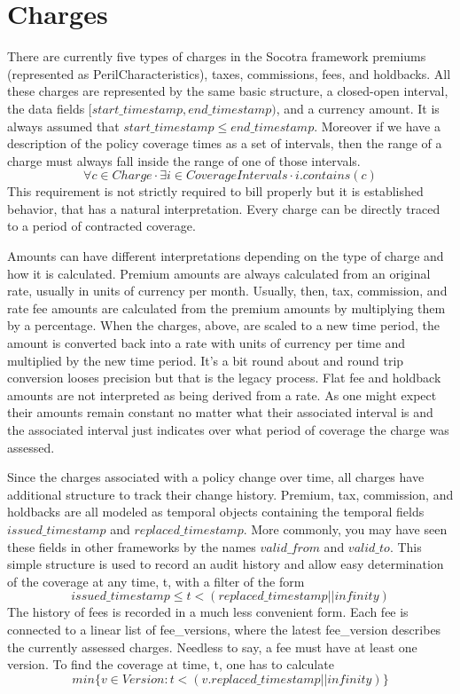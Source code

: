 \section{Charges}
\label{sec:03:4}
There are currently five types of charges in the Socotra framework premiums (represented as PerilCharacteristics), taxes,
commissions, fees, and holdbacks. All these charges are represented by the same basic structure, a closed-open
interval, the data fields $[start\_timestamp, end\_timestamp)$, and a currency amount. It is
always assumed that $start\_timestamp \leq end\_timestamp$. Moreover if we have a description of the
policy coverage times as a set of intervals, then the range of a charge must always
fall inside the range of one of those intervals.
\begin{equation*}
\forall c \in Charge \cdot \exists i \in CoverageIntervals \cdot i.contains(c)
\end{equation*}
This requirement is not strictly required to bill properly but it is established behavior, that has a natural
interpretation. Every charge can be directly traced to a period of contracted coverage.

Amounts can have different interpretations depending on the type of charge and how it is calculated.
Premium amounts are always calculated from an original rate, usually in units of currency per month. Usually, then,
tax, commission, and rate fee amounts are calculated from the premium amounts by multiplying them by a percentage.
When the charges, above, are scaled to a new time period, the amount is converted back into
a rate with units of currency per time and multiplied by the new time period. It's a bit
round about and round trip conversion looses precision but that is the legacy process. Flat fee and holdback amounts are
not interpreted as being derived from a rate. As one might expect their amounts remain constant no
matter what their associated interval is and the associated interval just indicates over what period of coverage the
charge was assessed.

Since the charges associated with a policy change over time, all charges have additional structure to track their
change history. Premium, tax, commission, and holdbacks are all modeled as temporal objects containing the temporal
fields $issued\_timestamp$ and $replaced\_timestamp$.
More commonly, you may have seen these fields in other frameworks by the names $valid\_from$ and
$valid\_to$. This simple structure is used to record an audit history and allow easy determination of the
coverage at any time, t, with a filter of the form
\begin{equation*}
issued\_timestamp \leq t < (replaced\_timestamp || infinity)
\end{equation*}
The history of fees is recorded in a much less convenient form. Each fee is connected to a linear list of fee\_versions, where
the latest fee\_version describes the currently assessed charges. Needless to say, a fee must have at least one version.
To find the coverage at time, t, one has to calculate
\begin{equation*}
min \lbrace v \in Version : t < (v.replaced\_timestamp || infinity) \rbrace
\end{equation*}

